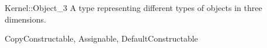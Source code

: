 \begin{ccRefConcept}{Kernel::Object_3}
A type representing different types of objects in three dimensions.

\ccRefines
CopyConstructable, Assignable, DefaultConstructable 

\ccSeeAlso
{} \\
 \\
 \\
 \\

\end{ccRefConcept}

